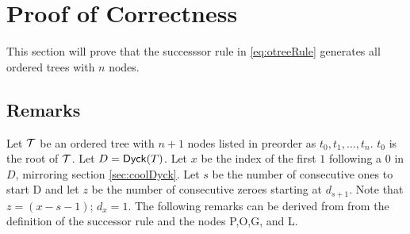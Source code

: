 
\section{Proof of Correctness} \label{sec:otree-proof}

This section will prove that the successsor rule in \ref{eq:otreeRule} generates all ordered trees with $n$ nodes.  
\subsection{Remarks}

Let $\mathcal{T}$ be an ordered tree with $n+1$ nodes listed in preorder as $t_0,t_1,...,t_n$.  $t_0$ is the root of $\mathcal{T}$. 
Let $D=\mathsf{Dyck}{(T)}$.  Let $x$ be the index of the first $1$ following a $0$ in $D$, mirroring section \ref{sec:coolDyck}.  Let $s$ be the number of consecutive ones to start D and let $z$ be the number of consecutive zeroes starting at $d_{s+1}$.  Note that $z=(x-s-1)$; $d_{x}=1$.
The following remarks can be derived from from the definition of the successor rule and the nodes P,O,G, and L. 


